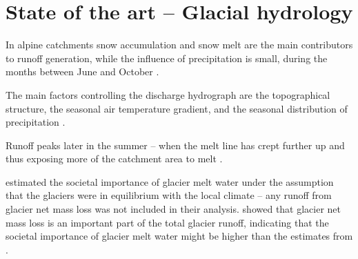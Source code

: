 \documentclass[12pt, a4paper]{article}
\begin{document}



\section{State of the art -- Glacial hydrology}
In alpine catchments snow accumulation and snow melt are the main contributors
to runoff generation, while the influence of precipitation is small, during the
months between June and October \parencite{zappaSeasonalWaterBalance2003}. 

The main factors controlling the discharge hydrograph are the topographical
structure, the seasonal air temperature gradient, and the seasonal distribution
of precipitation \parencite{zappaSeasonalWaterBalance2003}.

Runoff peaks later in the summer -- when the melt line has crept further up and
thus exposing more of the catchment area to melt \parencite{zappaSeasonalWaterBalance2003}.

\textcite{kaserContributionPotentialGlaciers2010} estimated the societal
importance of glacier melt water under the assumption that the glaciers were in
equilibrium with the local climate -- any runoff from glacier net mass loss was
not included in their analysis. \textcite{blissGlobalResponseGlacier2014} showed
that glacier net mass loss is an important part of the total glacier runoff,
indicating that the societal importance of glacier melt water might be higher
than the estimates from \textcite{kaserContributionPotentialGlaciers2010}.
\end{document}
